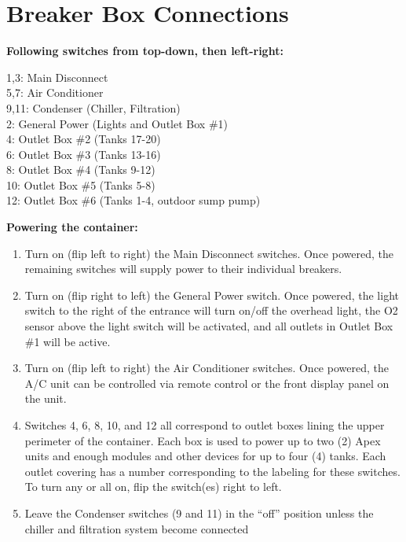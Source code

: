 \documentclass[
]{book}
\providecommand{\tightlist}{%
  \setlength{\itemsep}{0pt}\setlength{\parskip}{0pt}}
\begin{document}
\hypertarget{breaker-box-connections}{%
\chapter{Breaker Box Connections}\label{breaker-box-connections}}

\textbf{Following switches from top-down, then left-right:}

1,3: Main Disconnect\\
5,7: Air Conditioner\\
9,11: Condenser (Chiller, Filtration)\\
2: General Power (Lights and Outlet Box \#1)\\
4: Outlet Box \#2 (Tanks 17-20)\\
6: Outlet Box \#3 (Tanks 13-16)\\
8: Outlet Box \#4 (Tanks 9-12)\\
10: Outlet Box \#5 (Tanks 5-8)\\
12: Outlet Box \#6 (Tanks 1-4, outdoor sump pump)

\textbf{Powering the container:}

\begin{enumerate}
\def\labelenumi{\arabic{enumi}.}
\tightlist
\item
  Turn on (flip left to right) the Main Disconnect switches. Once powered, the remaining switches will supply power to their individual breakers.
\item
  Turn on (flip right to left) the General Power switch. Once powered, the light switch to the right of the entrance will turn on/off the overhead light, the O2 sensor above the light switch will be activated, and all outlets in Outlet Box \#1 will be active.
\item
  Turn on (flip left to right) the Air Conditioner switches. Once powered, the A/C unit can be controlled via remote control or the front display panel on the unit.
\item
  Switches 4, 6, 8, 10, and 12 all correspond to outlet boxes lining the upper perimeter of the container. Each box is used to power up to two (2) Apex units and enough modules and other devices for up to four (4) tanks. Each outlet covering has a number corresponding to the labeling for these switches. To turn any or all on, flip the switch(es) right to left.
\item
  Leave the Condenser switches (9 and 11) in the ``off'' position unless the chiller and filtration system become connected
\end{enumerate}
\end{document}
